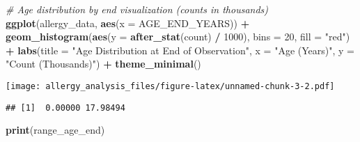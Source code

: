 \documentclass[
]{article}
\newenvironment{Shaded}{\begin{snugshade}}{\end{snugshade}}
\newcommand{\AttributeTok}[1]{\textcolor[rgb]{0.13,0.29,0.53}{#1}}
\newcommand{\CommentTok}[1]{\textcolor[rgb]{0.56,0.35,0.01}{\textit{#1}}}
\newcommand{\ConstantTok}[1]{\textcolor[rgb]{0.56,0.35,0.01}{#1}}
\newcommand{\DecValTok}[1]{\textcolor[rgb]{0.00,0.00,0.81}{#1}}
\newcommand{\FunctionTok}[1]{\textcolor[rgb]{0.13,0.29,0.53}{\textbf{#1}}}
\newcommand{\NormalTok}[1]{#1}
\newcommand{\OtherTok}[1]{\textcolor[rgb]{0.56,0.35,0.01}{#1}}
\newcommand{\SpecialCharTok}[1]{\textcolor[rgb]{0.81,0.36,0.00}{\textbf{#1}}}
\newcommand{\StringTok}[1]{\textcolor[rgb]{0.31,0.60,0.02}{#1}}
\begin{document}
\begin{Shaded}
\begin{Highlighting}[]
\CommentTok{\# Age distribution by end visualization (counts in thousands)}
\FunctionTok{ggplot}\NormalTok{(allergy\_data, }\FunctionTok{aes}\NormalTok{(}\AttributeTok{x =}\NormalTok{ AGE\_END\_YEARS)) }\SpecialCharTok{+}
  \FunctionTok{geom\_histogram}\NormalTok{(}\FunctionTok{aes}\NormalTok{(}\AttributeTok{y =} \FunctionTok{after\_stat}\NormalTok{(count) }\SpecialCharTok{/} \DecValTok{1000}\NormalTok{), }\AttributeTok{bins =} \DecValTok{20}\NormalTok{, }\AttributeTok{fill =} \StringTok{"red"}\NormalTok{) }\SpecialCharTok{+}
  \FunctionTok{labs}\NormalTok{(}\AttributeTok{title =} \StringTok{"Age Distribution at End of Observation"}\NormalTok{,}
       \AttributeTok{x =} \StringTok{"Age (Years)"}\NormalTok{,}
       \AttributeTok{y =} \StringTok{"Count (Thousands)"}\NormalTok{) }\SpecialCharTok{+}
  \FunctionTok{theme\_minimal}\NormalTok{()}
\end{Highlighting}
\end{Shaded}

\texttt{[image: allergy\_analysis\_files/figure-latex/unnamed-chunk-3-2.pdf]}

\begin{Shaded}
\end{Shaded}

\begin{verbatim}
## [1]  0.00000 17.98494
\end{verbatim}

\begin{Shaded}
\begin{Highlighting}[]
\FunctionTok{print}\NormalTok{(range\_age\_end)}
\end{Highlighting}
\end{Shaded}
\end{document}
